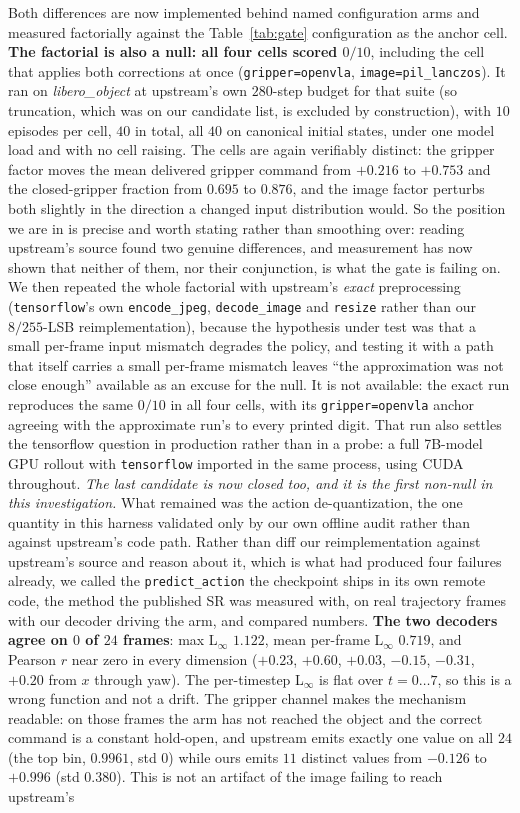 \documentclass{article}
\begin{document}
Both differences are now implemented behind named configuration arms and measured factorially against the Table~\ref{tab:gate} configuration as the anchor cell. \textbf{The factorial is also a null: all four cells scored $0/10$}, including the cell that applies both corrections at once (\texttt{gripper=openvla}, \texttt{image=pil\_lanczos}). It ran on \emph{libero\_object} at upstream's own $280$-step budget for that suite (so truncation, which was on our candidate list, is excluded by construction), with $10$ episodes per cell, $40$ in total, all $40$ on canonical initial states, under one model load and with no cell raising. The cells are again verifiably distinct: the gripper factor moves the mean delivered gripper command from $+0.216$ to $+0.753$ and the closed-gripper fraction from $0.695$ to $0.876$, and the image factor perturbs both slightly in the direction a changed input distribution would. So the position we are in is precise and worth stating rather than smoothing over: reading upstream's source found two genuine differences, and measurement has now shown that neither of them, nor their conjunction, is what the gate is failing on. We then repeated the whole factorial with upstream's \emph{exact} preprocessing (\texttt{tensorflow}'s own \texttt{encode\_jpeg}, \texttt{decode\_image} and \texttt{resize} rather than our $8/255$-LSB reimplementation), because the hypothesis under test was that a small per-frame input mismatch degrades the policy, and testing it with a path that itself carries a small per-frame mismatch leaves ``the approximation was not close enough'' available as an excuse for the null. It is not available: the exact run reproduces the same $0/10$ in all four cells, with its \texttt{gripper=openvla} anchor agreeing with the approximate run's to every printed digit. That run also settles the tensorflow question in production rather than in a probe: a full 7B-model GPU rollout with \texttt{tensorflow} imported in the same process, using CUDA throughout. \emph{The last candidate is now closed too, and it is the first non-null in this investigation.} What remained was the action de-quantization, the one quantity in this harness validated only by our own offline audit rather than against upstream's code path. Rather than diff our reimplementation against upstream's source and reason about it, which is what had produced four failures already, we called the \texttt{predict\_action} the checkpoint ships in its own remote code, the method the published SR was measured with, on real trajectory frames with our decoder driving the arm, and compared numbers. \textbf{The two decoders agree on $0$ of $24$ frames}: max L$_\infty$ $1.122$, mean per-frame L$_\infty$ $0.719$, and Pearson $r$ near zero in every dimension ($+0.23$, $+0.60$, $+0.03$, $-0.15$, $-0.31$, $+0.20$ from $x$ through yaw). The per-timestep L$_\infty$ is flat over $t{=}0\ldots7$, so this is a wrong function and not a drift. The gripper channel makes the mechanism readable: on those frames the arm has not reached the object and the correct command is a constant hold-open, and upstream emits exactly one value on all $24$ (the top bin, $0.9961$, std $0$) while ours emits $11$ distinct values from $-0.126$ to $+0.996$ (std $0.380$). This is not an artifact of the image failing to reach upstream's 
\end{document}
